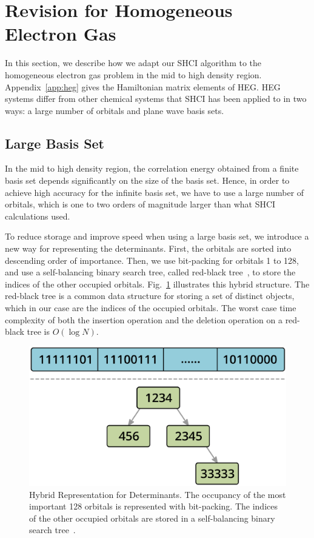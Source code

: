 \section{Revision for Homogeneous Electron Gas}
\label{HEG}

In this section, we describe how we adapt our SHCI algorithm to the homogeneous electron gas problem in the mid to high density region.
Appendix~\ref{app:heg} gives the Hamiltonian matrix elements of HEG.
HEG systems differ from other chemical systems that SHCI has been applied to in two ways: a large number of orbitals and plane wave basis sets.

\subsection{Large Basis Set}
In the mid to high density region, the correlation energy obtained from a finite basis set depends significantly on the size of the basis set.
Hence, in order to achieve high accuracy for the infinite basis set, we have to use a large number of orbitals, which is one to two orders of magnitude larger than what SHCI calculations used.

To reduce storage and improve speed when using a large basis set, we introduce a new way for representing the determinants.
First, the orbitals are sorted into descending order of importance.
Then, we use bit-packing for orbitals 1 to 128, and use a self-balancing binary search tree, called red-black tree~\cite{wiki:redblacktree}, to store the indices of the other occupied orbitals.
Fig.~\ref{fig:hybrid} illustrates this hybrid structure.
The red-black tree is a common data structure for storing a set of distinct objects, which in our case are the indices of the occupied orbitals. The worst case time complexity of both the insertion operation and the deletion operation on a red-black tree is $O(\log N)$.
\begin{figure}
  \begin{center}
  \includegraphics[width=0.9\linewidth]{figs/HybridDet.eps}
  \end{center}
  \vspace{-0.2cm}
  \caption{Hybrid Representation for Determinants.
  The occupancy of the most important 128 orbitals is represented with bit-packing.
  The indices of the other occupied orbitals are stored in a self-balancing binary search tree~\cite{wiki:redblacktree}.
  }
  \label{fig:hybrid}
\end{figure}

